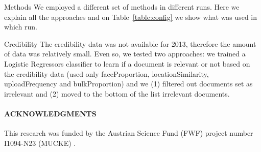 \documentclass{acm_proc_article-me}
\begin{document}



\begin{section}{Methods}
We employed a different set of methods in different runs. 
Here we explain all the approaches and on Table~\ref{table:config} we show what was used in which run.




\begin{subsection}{Credibility}
The credibility data was not available for 2013, therefore the amount of data was relatively small. 
Even so, we tested two approaches: we trained a Logistic Regressors classifier to learn if a document is relevant or not based on the credibility data (used only faceProportion, locationSimilarity, uploadFrequency and bulkProportion) and we (1) filtered out documents set as irrelevant and (2) moved to the bottom of the list irrelevant documents.
\end{subsection}
\end{section}




\paragraph{\textbf{ACKNOWLEDGMENTS}}
This research was funded by the Austrian Science Fund (FWF) project number I1094-N23 (MUCKE) .


  
\end{document}
